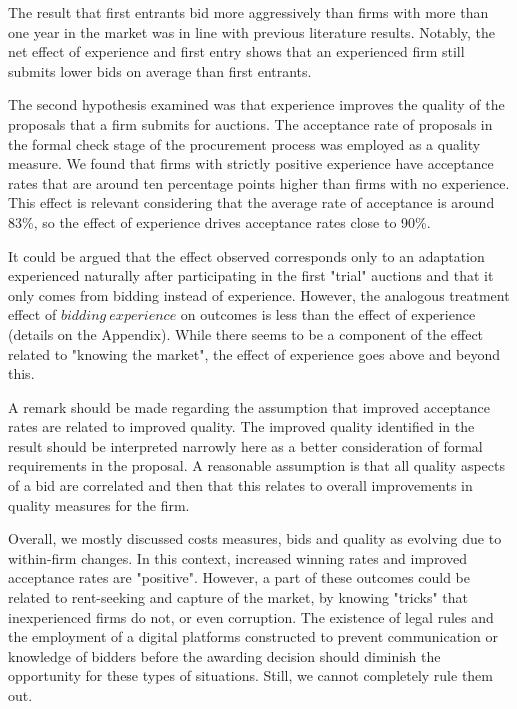 The result that first entrants bid more aggressively than firms with more than one year in the market was in line with previous literature results. Notably, the net effect of experience and first entry shows that an experienced firm still submits lower bids on average than first entrants.

The second hypothesis examined was that experience improves the quality of the proposals that a firm submits for auctions. The acceptance rate of proposals in the formal check stage of the procurement process was employed as a quality measure. We found that firms with strictly positive experience have acceptance rates that are around ten percentage points higher than firms with no experience. This effect is relevant considering that the average rate of acceptance is around 83\%, so the effect of experience drives acceptance rates close to 90\%.

It could be argued that the effect observed corresponds only to an adaptation experienced naturally after participating in the first "trial" auctions and that it only comes from bidding instead of experience. However, the analogous treatment effect of $bidding \ experience$ on outcomes is less than the effect of experience (details on the Appendix). While there seems to be a component of the effect related to "knowing the market", the effect of experience goes above and beyond this.

A remark should be made regarding the assumption that improved acceptance rates are related to improved quality. The improved quality identified in the result should be interpreted narrowly here as a better consideration of formal requirements in the proposal. A reasonable assumption is that all quality aspects of a bid are correlated and then that this relates to overall improvements in quality measures for the firm.

Overall, we mostly discussed costs measures, bids and quality as evolving due to within-firm changes. In this context, increased winning rates and improved acceptance rates are "positive". However, a part of these outcomes could be related to rent-seeking and capture of the market, by knowing "tricks" that inexperienced firms do not, or even corruption. The existence of legal rules  and the employment of a digital platforms constructed to prevent communication or knowledge of bidders before the awarding decision should diminish the opportunity for these types of situations. Still, we cannot completely rule them out.


